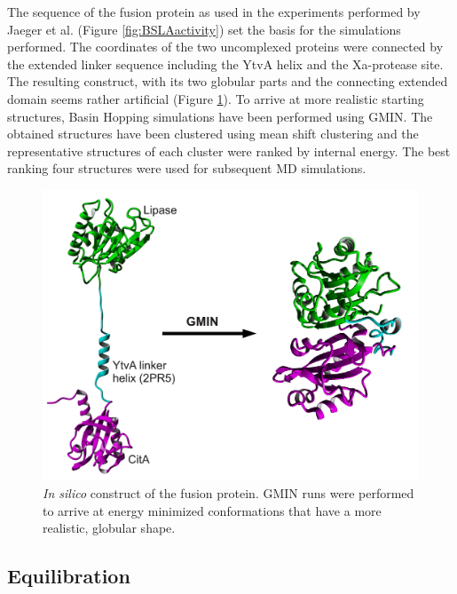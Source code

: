 \documentclass[english, a4paper, 12pt, titlepage, draft]{article}
\begin{document}
The sequence of the fusion protein as used in the experiments performed by Jaeger et al. (Figure \ref{fig:BSLAactivity}) set the basis for the simulations performed.
The coordinates of the two uncomplexed proteins were connected by the extended linker sequence including the YtvA helix and the Xa-protease site.
The resulting construct, with its two globular parts and the connecting extended domain seems rather artificial (Figure \ref{fig:ComplexConstruct}).
To arrive at more realistic starting structures, Basin Hopping simulations have been performed using GMIN.
The obtained structures have been clustered using mean shift clustering and the representative structures of each cluster were ranked by internal energy.
The best ranking four structures were used for subsequent MD simulations.


\begin{figure}
    \centering
    \includegraphics[width=1.0\textwidth]{figures/Complex_folding/complex_folding.pdf}
    \caption{\emph{In silico} construct of the fusion protein. GMIN runs were performed to arrive at energy minimized conformations that have a more realistic, globular shape.}
    \label{fig:ComplexConstruct}
\end{figure}      
 


\subsection{Equilibration}
\label{sec:eq}
\end{document}
